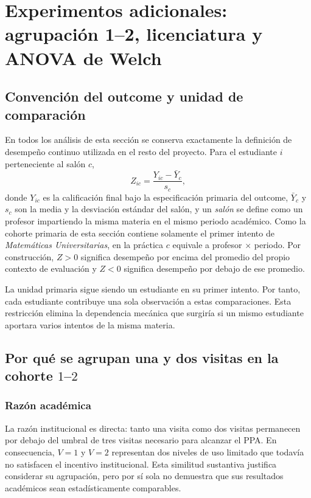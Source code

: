 \section{Experimentos adicionales: agrupación 1--2, licenciatura y ANOVA de Welch}
\label{sec:experimentos_adicionales}

\subsection{Convención del outcome y unidad de comparación}

En todos los análisis de esta sección se conserva exactamente la definición de desempeño continuo utilizada en el resto del proyecto. Para el estudiante $i$ perteneciente al salón $c$,
\[
Z_{ic}=\frac{Y_{ic}-\bar Y_c}{s_c},
\]
donde $Y_{ic}$ es la calificación final bajo la especificación primaria del outcome, $\bar Y_c$ y $s_c$ son la media y la desviación estándar del salón, y un \emph{salón} se define como un profesor impartiendo la misma materia en el mismo periodo académico. Como la cohorte primaria de esta sección contiene solamente el primer intento de \textit{Matemáticas Universitarias}, en la práctica $c$ equivale a profesor $\times$ periodo. Por construcción, $Z>0$ significa desempeño por encima del promedio del propio contexto de evaluación y $Z<0$ significa desempeño por debajo de ese promedio.

La unidad primaria sigue siendo un estudiante en su primer intento. Por tanto, cada estudiante contribuye una sola observación a estas comparaciones. Esta restricción elimina la dependencia mecánica que surgiría si un mismo estudiante aportara varios intentos de la misma materia.

\subsection{Por qué se agrupan una y dos visitas en la cohorte \texorpdfstring{$1$--$2$}{1--2}}

\subsubsection{Razón académica}

La razón institucional es directa: tanto una visita como dos visitas permanecen por debajo del umbral de tres visitas necesario para alcanzar el PPA. En consecuencia, $V=1$ y $V=2$ representan dos niveles de uso limitado que todavía no satisfacen el incentivo institucional. Esta similitud sustantiva justifica considerar su agrupación, pero por sí sola no demuestra que sus resultados académicos sean estadísticamente comparables.

